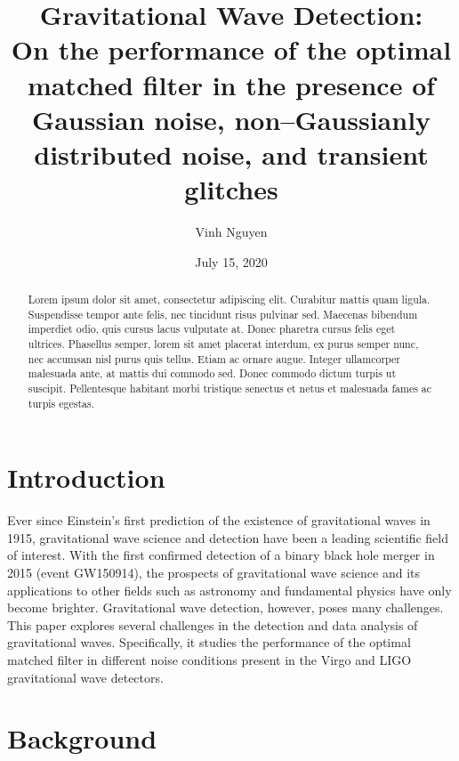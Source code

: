 \documentclass[reprint,
letterpaper,
 amsmath,amssymb,
 aps,
]{revtex4-2}
\begin{document}
\doublespacing
\title{Gravitational Wave Detection:\\
On the performance of the optimal matched filter in the presence of Gaussian noise, non–Gaussianly distributed noise, and transient glitches}
\author{Vinh Nguyen}
\date{July 15, 2020}
\begin{abstract}
Lorem ipsum dolor sit amet, consectetur adipiscing elit. Curabitur mattis quam ligula. Suspendisse tempor ante felis, nec tincidunt risus pulvinar sed. Maecenas bibendum imperdiet odio, quis cursus lacus vulputate at. Donec pharetra cursus felis eget ultrices. Phasellus semper, lorem sit amet placerat interdum, ex purus semper nunc, nec accumsan nisl purus quis tellus. Etiam ac ornare augue. Integer ullamcorper malesuada ante, at mattis dui commodo sed. Donec commodo dictum turpis ut suscipit. Pellentesque habitant morbi tristique senectus et netus et malesuada fames ac turpis egestas.
\end{abstract}
\maketitle

\section{Introduction}
Ever since Einstein's first prediction of the existence of gravitational waves in 1915, gravitational wave science and detection have been a leading scientific field of interest. With the first confirmed detection of a binary black hole merger in 2015 (event GW150914), the prospects of gravitational wave science and its applications to other fields such as astronomy and fundamental physics have only become brighter. Gravitational wave detection, however, poses many challenges. This paper explores several challenges in the detection and data analysis of gravitational waves. Specifically, it studies the performance of the optimal matched filter in different noise conditions present in the Virgo and LIGO gravitational wave detectors.


\section{Background}
\end{document}

